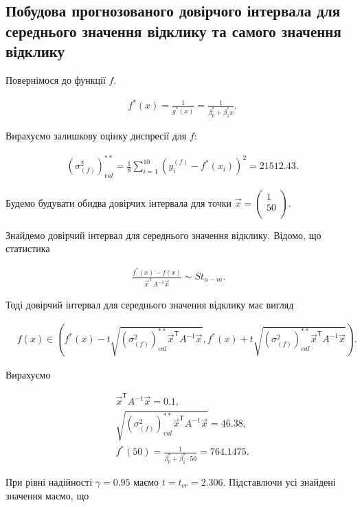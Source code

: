 \documentclass[14pt,a4paper]{scrartcl}
\theoremstyle{definition}
\theoremstyle{remark}
\theoremstyle{definition}
\theoremstyle{definition}
\begin{document}
\subsection{Побудова прогнозованого довірчого інтервала для середнього значення відклику та самого значення відклику}

Повернімося до функції $f$.

\begin{align*}
  & f^{*}(x) = \frac{1}{g^{*}(x)} = \frac{1}{\beta^{*}_{0} +  \beta^{*}_{1} x}.
\end{align*}

Вирахуємо залишкову оцінку диспресії для $f$:

\begin{align*}
  & (\sigma_{(f)}^2)^{**}_{val} = \frac{1}{8} \sum_{i = 1}^{10} (y_{i}^{(f)} - f^{*}(x_{i}))^2 = 21512.43.
\end{align*}

Будемо будувати обидва довірчих інтервала для точки $\vec{x} = \begin{pmatrix}
  1 \\
  50\\
\end{pmatrix}$.

Знайдемо довірчий інтервал для середнього значення відклику. Відомо, що статистика

\begin{align*}
  \frac{f^{*}(x) - f(x)}{\vec{x}^\mathsf{T}A^{-1}\vec{x}} \sim St_{n - m}.
\end{align*}

Тоді довірчий інтервал для середнього значення відклику має вигляд

\begin{align*}
  & f(x) \in \left( f^{*}(x) - t \sqrt{(\sigma_{(f)}^2)^{**}_{val}  \vec{x}^\mathsf{T} A^{-1} \vec{x}}, f^{*}(x) + t \sqrt{(\sigma_{(f)}^2)^{**}_{val} \vec{x}^\mathsf{T} A^{-1} \vec{x}}  \right).
\end{align*}

Вирахуємо

\begin{align*}
  & \vec{x}^\mathsf{T}A^{-1}\vec{x} = 0.1, \\
  & \sqrt{(\sigma_{(f)}^2)^{**}_{val} \vec{x}^\mathsf{T} A^{-1} \vec{x}} = 46.38, \\
  & f^{*}(50) = \frac{1}{\beta^{*}_{0} +  \beta^{*}_{1} \cdot 50} = 764.1475.
\end{align*}

При рівні надійності $\gamma = 0.95$ маємо $t = t_{cr} = 2.306$. Підставлючи усі знайдені значення маємо, що
\end{document}
